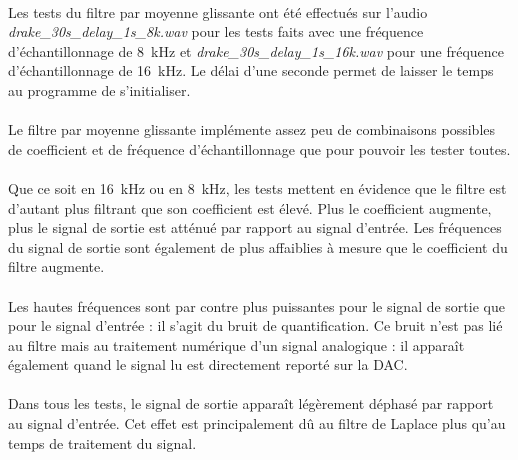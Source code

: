 \documentclass{article}
\begin{document}
    \paragraph{}
    Les tests du filtre par moyenne glissante ont été effectués sur l'audio \emph{drake\_30s\_delay\_1s\_8k.wav} pour les tests faits avec une fréquence d'échantillonnage de \SI{8}{\kilo\hertz} et \emph{drake\_30s\_delay\_1s\_16k.wav} pour une fréquence d'échantillonnage de \SI{16}{\kilo\hertz}. Le délai d'une seconde permet de laisser le temps au programme de s'initialiser.

    \paragraph{}
    Le filtre par moyenne glissante implémente assez peu de combinaisons possibles de coefficient et de fréquence d'échantillonnage que pour pouvoir les tester toutes.

    \paragraph{}
    Que ce soit en \SI{16}{\kilo\hertz} ou en \SI{8}{\kilo\hertz}, les tests mettent en évidence que le filtre est d'autant plus filtrant que son coefficient est élevé. Plus le coefficient augmente, plus le signal de sortie est atténué par rapport au signal d'entrée. Les fréquences du signal de sortie sont également de plus affaiblies à mesure que le coefficient du filtre augmente.

    \paragraph{}
    Les hautes fréquences sont par contre plus puissantes pour le signal de sortie que pour le signal d'entrée : il s'agit du bruit de quantification. Ce bruit n'est pas lié au filtre mais au traitement numérique d'un signal analogique : il apparaît également quand le signal lu est directement reporté sur la DAC.

    \paragraph{}
    Dans tous les tests, le signal de sortie apparaît légèrement déphasé par rapport au signal d'entrée. Cet effet est principalement dû au filtre de Laplace plus qu'au temps de traitement du signal.

\end{document}
